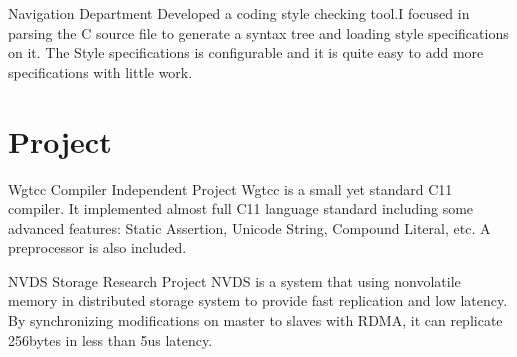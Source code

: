\documentclass[11pt,a4paper]{moderncv}
\begin{document}
{Navigation Department}
{}{}{
	Developed a coding style checking tool.I focused in parsing the C source file to generate a
	syntax tree and loading style specifications on it. The Style specifications is configurable
	and it is quite easy to add more specifications with little work.
}

\section{Project}


{Wgtcc}
{Compiler}
{Independent Project}{}{
	Wgtcc is a small yet standard C11 compiler. It implemented almost full C11 language standard including some advanced features: Static Assertion, Unicode String, Compound Literal, etc. A preprocessor is also included. 
}


{NVDS}
{Storage}
{Research Project}{}{
	NVDS is a system that using nonvolatile memory in distributed storage system to provide fast replication and low latency. By synchronizing modifications on master to slaves with RDMA, it can replicate 256bytes in less than 5us latency.
}





\end{document}
